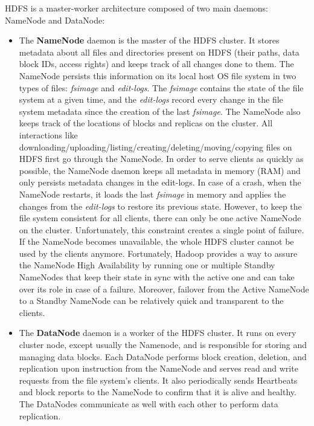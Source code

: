 \documentclass[12pt,english]{book}
\begin{document}
HDFS is a master-worker architecture composed of two main daemons: NameNode and DataNode:
\begin{itemize}
\item
The \textbf{NameNode} daemon is the master of the HDFS cluster.
It stores metadata about all files and directories present on HDFS (their paths, data block IDs, access rights) and keeps track of all changes done to them.
The NameNode persists this information on its local host OS file system in two types of files: \emph{fsimage} and \emph{edit-logs}.
The \emph{fsimage} contains the state of the file system at a given time, and the \emph{edit-logs} record every change in the file system metadata since the creation of the last \emph{fsimage}.
The NameNode also keeps track of the locations of blocks and replicas on the cluster.
All interactions like downloading/uploading/listing/creating/deleting/moving/copying files on HDFS first go through the NameNode.
In order to serve clients as quickly as possible, the NameNode daemon keeps all metadata in memory (RAM) and only persists metadata changes in the edit-logs.
In case of a crash, when the NameNode restarts, it loads the last \emph{fsimage} in memory and applies the changes from the \emph{edit-logs} to restore its previous state. 
However, to keep the file system consistent for all clients, there can only be one active NameNode on the cluster.
Unfortunately, this constraint creates a single point of failure.
If the NameNode becomes unavailable, the whole HDFS cluster cannot be used by the clients anymore.
Fortunately, Hadoop provides a way to assure the NameNode High Availability by running one or multiple Standby NameNodes that keep their state in sync with the active one and can take over its role in case of a failure.
Moreover, failover from the Active NameNode to a Standby NameNode can be relatively quick and transparent to the clients.

\item
The \textbf{DataNode} daemon is a worker of the HDFS cluster.
It runs on every cluster node, except usually the Namenode, and is responsible for storing and managing data blocks.
Each DataNode performs block creation, deletion, and replication upon instruction from the NameNode and serves read and write requests from the file system's clients.
It also periodically sends Heartbeats and block reports to the NameNode to confirm that it is alive and healthy.
The DataNodes communicate as well with each other to perform data replication.
\end{itemize}
\end{document}
